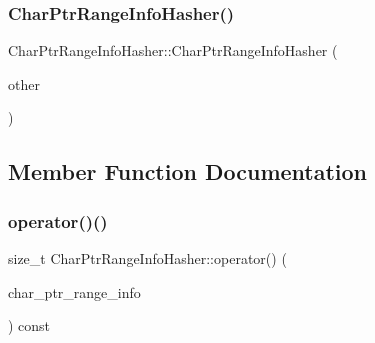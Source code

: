 \subsubsection{\texorpdfstring{Char\+Ptr\+Range\+Info\+Hasher()}{CharPtrRangeInfoHasher()}\hspace{0.1cm}{\footnotesize\ttfamily [2/2]}}
{\footnotesize\ttfamily Char\+Ptr\+Range\+Info\+Hasher\+::\+Char\+Ptr\+Range\+Info\+Hasher (\begin{DoxyParamCaption}\item[{\mbox{\hyperlink{ZlibCrc32_8h_a2c212835823e3c54a8ab6d95c652660e}{const}} \mbox{\hyperlink{classlucene_1_1core_1_1analysis_1_1characterutil_1_1CharPtrRangeInfoHasher}{Char\+Ptr\+Range\+Info\+Hasher}} \&}]{other }\end{DoxyParamCaption})\hspace{0.3cm}{\ttfamily [explicit]}}



\subsection{Member Function Documentation}
\mbox{\label{classlucene_1_1core_1_1analysis_1_1characterutil_1_1CharPtrRangeInfoHasher_a2118b191b9a974e05872a5b3a562802d}} 
\subsubsection{\texorpdfstring{operator()()}{operator()()}}
{\footnotesize\ttfamily size\+\_\+t Char\+Ptr\+Range\+Info\+Hasher\+::operator() (\begin{DoxyParamCaption}\item[{\mbox{\hyperlink{ZlibCrc32_8h_a2c212835823e3c54a8ab6d95c652660e}{const}} \mbox{\hyperlink{classlucene_1_1core_1_1analysis_1_1characterutil_1_1CharPtrRangeInfo}{Char\+Ptr\+Range\+Info}} \&}]{char\+\_\+ptr\+\_\+range\+\_\+info }\end{DoxyParamCaption}) const}



